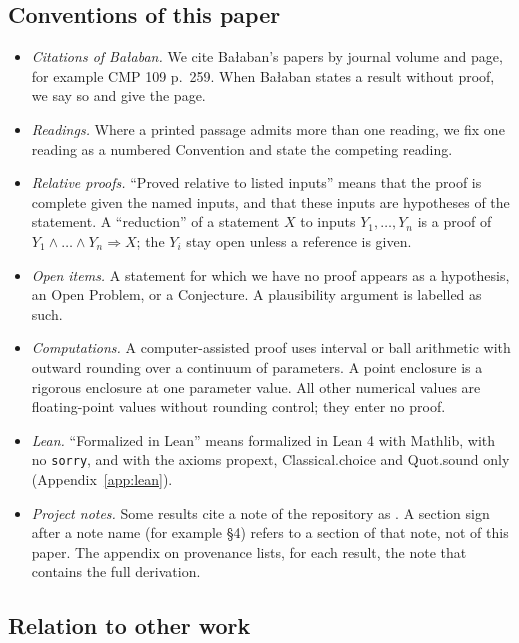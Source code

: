 \subsection{Conventions of this paper}\label{sec:status}

\begin{itemize}
\item \emph{Citations of Ba{\l}aban.} We cite Ba{\l}aban's papers by journal volume and page, for example CMP 109 p.~259. When Ba{\l}aban states a result without proof, we say so and give the page.
\item \emph{Readings.} Where a printed passage admits more than one reading, we fix one reading as a numbered Convention and state the competing reading.
\item \emph{Relative proofs.} ``Proved relative to listed inputs'' means that the proof is complete given the named inputs, and that these inputs are hypotheses of the statement. A ``reduction'' of a statement $X$ to inputs $Y_1,\dots,Y_n$ is a proof of $Y_1\wedge\dots\wedge Y_n\Rightarrow X$; the $Y_i$ stay open unless a reference is given.
\item \emph{Open items.} A statement for which we have no proof appears as a hypothesis, an Open Problem, or a Conjecture. A plausibility argument is labelled as such.
\item \emph{Computations.} A computer-assisted proof uses interval or ball arithmetic with outward rounding over a continuum of parameters. A point enclosure is a rigorous enclosure at one parameter value. All other numerical values are floating-point values without rounding control; they enter no proof.
\item \emph{Lean.} ``Formalized in Lean'' means formalized in Lean 4 with Mathlib, with no \texttt{sorry}, and with the axioms propext, Classical.choice and Quot.sound only (Appendix~\ref{app:lean}).
\item \emph{Project notes.} Some results cite a note of the repository as . A section sign after a note name (for example  \S4) refers to a section of that note, not of this paper. The appendix on provenance lists, for each result, the note that contains the full derivation.
\end{itemize}

\subsection{Relation to other work}\label{sec:independence}

